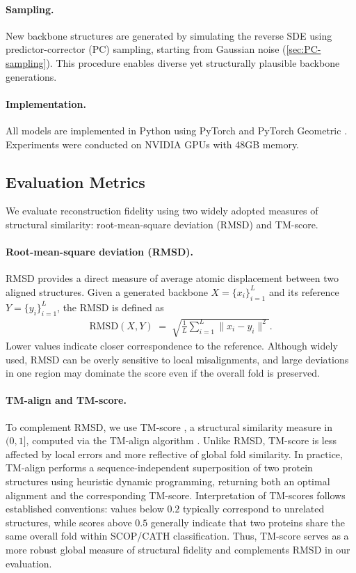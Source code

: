 \documentclass[a4paper,12pt]{article}
\begin{document}
\paragraph{Sampling.}
New backbone structures are generated by simulating the reverse SDE using predictor-corrector (PC) sampling, starting from Gaussian noise (\cref{sec:PC-sampling}). This procedure enables diverse yet structurally plausible backbone generations.

\paragraph{Implementation.}
All models are implemented in Python using PyTorch and PyTorch Geometric \citep{PyG1.0,PyG2.0}. 
Experiments were conducted on NVIDIA GPUs with 48GB memory.

\subsection{Evaluation Metrics}\label{subsec:metrics}
We evaluate reconstruction fidelity using two widely adopted measures of structural similarity: root-mean-square deviation (RMSD) and TM-score.

\paragraph{Root-mean-square deviation (RMSD).}
RMSD provides a direct measure of average atomic displacement between two aligned structures. 
Given a generated backbone \(X=\{x_i\}_{i=1}^L\) and its reference \(Y=\{y_i\}_{i=1}^L\), 
the RMSD is defined as
\begin{align*}
    \mathrm{RMSD}(X, Y) \;=\; \sqrt{\frac{1}{L}\sum_{i=1}^{L} \|x_i - y_i\|^2}.
\end{align*}
Lower values indicate closer correspondence to the reference. 
Although widely used, RMSD can be overly sensitive to local misalignments, 
and large deviations in one region may dominate the score even if the overall fold is preserved.

\paragraph{TM-align and TM-score.}
To complement RMSD, we use TM-score \citep{zhang2004ScoringFunctionAutomated,xu2010HowSignificantProtein}, a structural similarity measure in \((0,1]\), computed via the TM-align algorithm \citep{zhang2005TMalignProteinStructure}. Unlike RMSD, TM-score is less affected by local errors and more reflective of global fold similarity. In practice, TM-align performs a sequence-independent superposition of two protein structures using heuristic dynamic programming, returning both an optimal alignment and the corresponding TM-score. Interpretation of TM-scores follows established conventions: values below \(0.2\) typically correspond to unrelated structures, while scores above \(0.5\) generally indicate that two proteins share the same overall fold within SCOP/CATH classification. Thus, TM-score serves as a more robust global measure of structural fidelity and complements RMSD in our evaluation.
\end{document}
